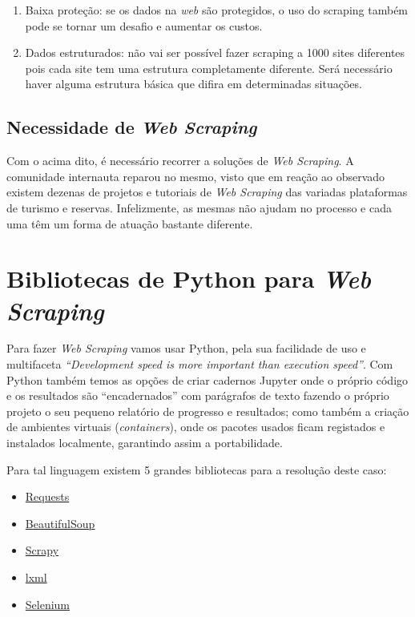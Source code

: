 \documentclass[a4paper,10pt]{article}
\begin{document}
\begin{enumerate}
    \item Baixa proteção: se os dados na \textit{web} são protegidos, o uso do scraping também pode se tornar um desafio e aumentar os custos.
    \item Dados estruturados: não vai ser possível fazer scraping a 1000 sites diferentes pois cada site tem uma estrutura completamente diferente.  Será necessário haver alguma estrutura básica que difira em determinadas situações.
\end{enumerate}

\subsection{Necessidade de \textit{Web Scraping}}

Com o acima dito, é necessário recorrer a soluções de \textit{Web Scraping}.
A comunidade internauta reparou no mesmo, visto que em reação ao observado existem dezenas de projetos e tutoriais de \textit{Web Scraping} das variadas plataformas de turismo e reservas.
Infelizmente, as mesmas não ajudam no processo e cada uma têm um forma de atuação bastante diferente.

\section{Bibliotecas de Python para \textit{Web Scraping}}

Para fazer \textit{Web Scraping} vamos usar Python, pela sua facilidade de uso e multifaceta \textit{``Development speed is more important than execution speed''}.
Com Python também temos as opções de criar cadernos Jupyter onde o próprio código e os resultados são ``encadernados'' com parágrafos de texto fazendo o próprio projeto o seu pequeno relatório de progresso e resultados; como também a criação de ambientes virtuais (\textit{containers}), onde os pacotes usados ficam registados e instalados localmente, garantindo assim a portabilidade.

Para tal linguagem existem 5 grandes bibliotecas para a resolução deste caso:
\begin{itemize}
    \item \href{https://pypi.org/project/requests/}{Requests}
    \item \href{https://pypi.org/project/BeautifulSoup/}{BeautifulSoup}
    \item \href{https://pypi.org/project/Scrapy3/}{Scrapy}
    \item \href{https://pypi.org/project/lxml/}{lxml}
    \item \href{https://pypi.org/project/selenium/}{Selenium}
\end{itemize}
\end{document}
